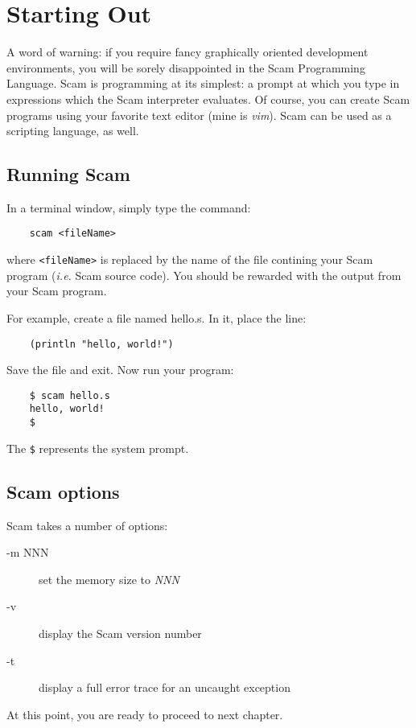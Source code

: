 \chapter{Starting Out}
\label{StartingOut}

A word of warning: if you require fancy graphically oriented development
environments, you will be sorely disappointed in the Scam Programming
Language. Scam is programming at its simplest: a prompt at which you type
in expressions which the Scam interpreter evaluates. Of course, you can
create Scam programs using your favorite text editor (mine is {\it vim}).
Scam can be used as a scripting language, as well.

\section{Running Scam}

In a terminal window, simply type the command:

\begin{verbatim}
    scam <fileName>
\end{verbatim}

where \verb!<fileName>! is replaced by the name of the file contining your
Scam program ({\it i.e.} Scam source code).
You should be rewarded with the output from your Scam program.

For example, create a file named hello.s. In it, place the line:

\begin{verbatim}
    (println "hello, world!")
\end{verbatim}

Save the file and exit. Now run your program:

\begin{verbatim}
    $ scam hello.s
    hello, world!
    $
\end{verbatim}

The \verb!$! represents the system prompt.

\section{Scam options}

Scam takes a number of options:

\begin{description}
\item[-m NNN]
    
    set the memory size to {\it NNN}
    
\item[-v]

    display the Scam version number

\item[-t]

    display a full error trace for an uncaught exception

\end{description}

At this point, you are ready to proceed to next chapter.
